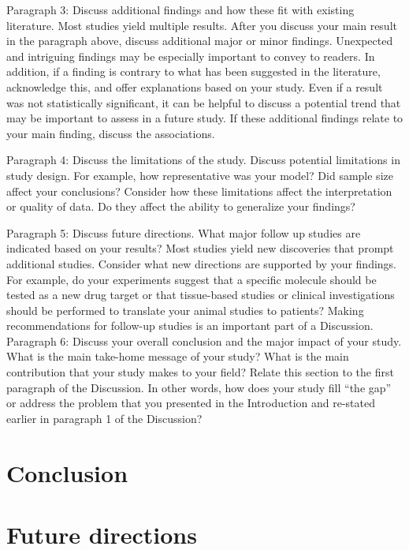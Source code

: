 Paragraph 3: Discuss additional findings and how these fit with existing literature.
 	Most studies yield multiple results. After you discuss your main result in the paragraph above, discuss additional major or minor findings. Unexpected and intriguing findings may be especially important to convey to readers. In addition, if a finding is contrary to what has been suggested in the literature, acknowledge this, and offer explanations based on your study. Even if a result was not statistically significant, it can be helpful to discuss a potential trend that may be important to assess in a future study. If these additional findings relate to your main finding, discuss the associations.

Paragraph 4: Discuss the limitations of the study.
 	Discuss potential limitations in study design. For example, how representative was your model? Did sample size affect your conclusions? Consider how these limitations affect the interpretation or quality of data. Do they affect the ability to generalize your findings?

Paragraph 5: Discuss future directions. 
What major follow up studies are indicated based on your results? Most studies yield new discoveries that prompt additional studies. Consider what new directions are supported by your findings. For example, do your experiments suggest that a specific molecule should be tested as a new drug target or that tissue-based studies or clinical investigations should be performed to translate your animal studies to patients? Making recommendations for follow-up studies is an important part of a Discussion.
Paragraph 6: Discuss your overall conclusion and the major impact of your study.
What is the main take-home message of your study?
What is the main contribution that your study makes to your field?
Relate this section to the first paragraph of the Discussion. In other words, how does your study fill “the gap” or address the problem that you presented in the Introduction and re-stated earlier in paragraph 1 of the Discussion?

\section{Conclusion}


\section{Future directions}

